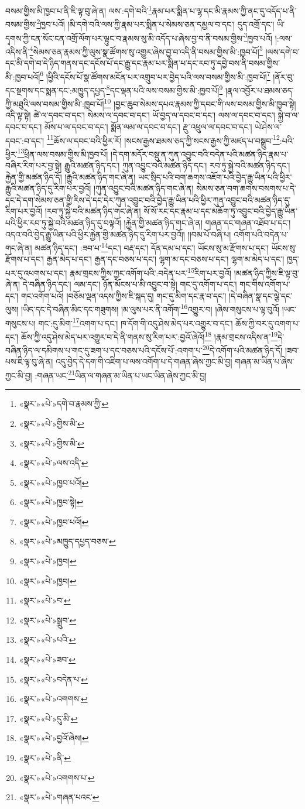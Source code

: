 བསམ་གྱིས་མི་ཁྱབ་པ་ནི་ཇི་ལྟ་བུ་ཞེ་ན། ལས་:དགེ་བའི་\footnote{«སྣར་»«པེ་»དགེ་བ་རྣམས་ཀྱི་}རྣམ་པར་སྨིན་པ་ལྷ་དང་མི་རྣམས་ཀྱི་ནང་དུ་འདོད་པ་ནི་བསམ་གྱིས་\footnote{«སྣར་»«པེ་»གྱིས་མི་}ཁྱབ་པའོ། །མི་དགེ་བའི་ལས་ཀྱི་རྣམ་པར་སྨིན་པ་སེམས་ཅན་དམྱལ་བ་དང་། དུད་འགྲོ་དང་། ཡི་དྭགས་ཀྱི་ངན་སོང་ངན་འགྲོ་ལོག་པར་ལྟུང་བ་རྣམས་སུ་མི་འདོད་པ་ཞེས་བྱ་བ་ནི་བསམ་གྱིས་\footnote{«སྣར་»«པེ་»གྱིས་མི་}ཁྱབ་པའོ། །:ལས་འདིས་ནི་\footnote{«སྣར་»«པེ་»ལས་འདི་}སེམས་ཅན་རྣམས་ཀྱི་ལུས་སྣ་ཚོགས་སུ་འགྱུར་ཞེས་བྱ་བ་འདི་ནི་བསམ་གྱིས་མི་:ཁྱབ་པོ།\footnote{«སྣར་»«པེ་»ཁྱབ་པའོ།} །ལས་དགེ་བ་དང་མི་དགེ་བ་དེ་ཉིད་གནས་དང་དངོས་པོ་དང་རྒྱུ་དང་རྣམ་པར་སྨིན་པ་དང་རབ་ཏུ་དབྱེ་བས་ནི་བསམ་གྱིས་མི་:ཁྱབ་པའོ།\footnote{«སྣར་»«པེ་»ཁྱབ་སྟེ།} །ཕྱིའི་དངོས་པོ་སྣ་ཚོགས་མངོན་པར་འགྲུབ་པར་བྱེད་པའི་ལས་བསམ་གྱིས་མི་:ཁྱབ་པོ།\footnote{«སྣར་»«པེ་»ཁྱབ་པའོ།} །ནོར་བུ་དང་སྔགས་དང་སྨན་དང་:མཁྱུད་དཔྱད་\footnote{«སྣར་»«པེ་»མཁྱུད་དཔྱད་བཅས་}དང་ལྡན་པའི་ལས་བསམ་གྱིས་མི་:ཁྱབ་པོ།\footnote{«སྣར་»«པེ་»ཁྱབ།} །རྣལ་འབྱོར་པ་ཐམས་ཅད་ཀྱི་མཐུའི་ལས་བསམ་གྱིས་མི་:ཁྱབ་པོ།\footnote{«སྣར་»«པེ་»ཁྱབ།} །བྱང་ཆུབ་སེམས་དཔའ་རྣམས་ཀྱི་དབང་གི་ལས་བསམ་གྱིས་མི་ཁྱབ་སྟེ། འདི་ལྟ་སྟེ། ཚེ་ལ་དབང་བ་དང་། སེམས་ལ་དབང་བ་དང་། ཡོ་བྱད་ལ་དབང་བ་དང་། ལས་ལ་དབང་བ་དང་། སྐྱེ་བ་ལ་དབང་བ་དང་། མོས་པ་ལ་དབང་བ་དང་། སྨོན་ལམ་ལ་དབང་བ་དང་། རྫུ་འཕྲུལ་ལ་དབང་བ་དང་། ཡེ་ཤེས་ལ་དབང་:བ་དང་། \footnote{«སྣར་»«པེ་»བ་}ཆོས་ལ་དབང་བའི་ཕྱིར་རོ། །སངས་རྒྱས་ཐམས་ཅད་ཀྱི་སངས་རྒྱས་ཀྱི་མཛད་པ་བསྒྲུབ་\footnote{«སྣར་»«པེ་»སྒྲུབ་}:པའི་ཕྱིར་\footnote{«སྣར་»«པེ་»པའི་}ཕྲིན་ལས་བསམ་གྱིས་མི་ཁྱབ་པོ། །དེ་དག་མདོར་བསྡུ་ན་ཀུན་འབྱུང་བའི་བདེན་པའི་མཚན་ཉིད་རྣམ་པ་བཞིར་རིག་པར་བྱ་སྟེ། རྒྱུའི་མཚན་ཉིད་དང་། ཀུན་འབྱུང་བའི་མཚན་ཉིད་དང་། རབ་ཏུ་སྐྱེ་བའི་མཚན་ཉིད་དང་། རྐྱེན་གྱི་མཚན་ཉིད་དོ། །རྒྱུའི་མཚན་ཉིད་གང་ཞེ་ན། ཡང་སྲིད་པའི་བག་ཆགས་འཇོག་པའི་བྱེད་རྒྱུ་ཡིན་པའི་ཕྱིར་རྒྱུའི་མཚན་ཉིད་དུ་རིག་པར་བྱའོ། །ཀུན་འབྱུང་བའི་མཚན་ཉིད་གང་ཞེ་ན། སེམས་ཅན་བག་ཆགས་བསགས་པ་དེ་དང་དེ་དག་སེམས་ཅན་གྱི་རིས་དེ་དང་དེར་ཀུན་འབྱུང་བའི་བྱེད་རྒྱུ་ཡིན་པའི་ཕྱིར་ཀུན་འབྱུང་བའི་མཚན་ཉིད་དུ་རིག་པར་བྱའོ། །རབ་ཏུ་སྐྱེ་བའི་མཚན་ཉིད་གང་ཞེ་ན། སོ་སོ་རང་དང་རྣམ་པ་དང་མཆོག་ཏུ་འབྱུང་བའི་བྱེད་རྒྱུ་ཡིན་པའི་ཕྱིར་རབ་ཏུ་སྐྱེ་བའི་མཚན་ཉིད་དུ་བལྟའོ། །རྐྱེན་གྱི་མཚན་ཉིད་གང་ཞེ་ན། གཞན་དང་གཞན་འཐོབ་པ་དང་། འདའ་བའི་བྱེད་རྒྱུ་ཡིན་པའི་ཕྱིར་རྐྱེན་གྱི་མཚན་ཉིད་དུ་རིག་པར་བྱའོ།། །།བམ་པོ་བཞི་པ། འགོག་པའི་བདེན་པ་གང་ཞེ་ན། མཚན་ཉིད་དང་། :ཟབ་པ་\footnote{«སྣར་»«པེ་»ཟབ་}དང་། བརྡ་དང་། དོན་དམ་པ་དང་། ཡོངས་སུ་མ་རྫོགས་པ་དང་། ཡོངས་སུ་རྫོགས་པ་དང་། རྒྱན་མེད་པ་དང་། རྒྱན་དང་བཅས་པ་དང་། ལྷག་མ་དང་བཅས་པ་དང་། ལྷག་མ་མེད་པ་དང་། ཁྱད་པར་དུ་འཕགས་པ་དང་། རྣམ་གྲངས་ཀྱིས་ཀྱང་འགོག་པའི་:བདེན་པར་\footnote{«སྣར་»«པེ་»བདེན་པ་}རིག་པར་བྱའོ། །མཚན་ཉིད་ཀྱིས་ཇི་ལྟ་བུ་ཞེ་ན། དེ་བཞིན་ཉིད་དང་། ལམ་དང་། ཉོན་མོངས་པ་མི་འབྱུང་བ་སྟེ། གང་དུ་འགོག་པ་དང་། གང་གིས་འགོག་པ་དང་། གང་འགོག་པའོ། །བཅོམ་ལྡན་འདས་ཀྱིས་ཇི་སྐད་དུ། གང་དུ་མིག་དང་རྣ་བ་དང་། །དེ་བཞིན་སྣ་དང་ལྕེ་དང་ལུས། །ཡིད་དང་དེ་བཞིན་མིང་དང་གཟུགས། །མ་ལུས་པར་ནི་འགོག་\footnote{«སྣར་»«པེ་»འགགས་}འགྱུར་བ། །ཞེས་གསུངས་པ་ལྟ་བུའོ། །ཡང་གསུངས་པ། གང་:དུ་མིག་\footnote{«སྣར་»«པེ་»དུ་མི་}འགག་པ་དང་། ཁ་དོག་གི་འདུ་ཤེས་མེད་པར་འགྱུར་བ་དང་། ཆོས་ཀྱི་བར་དུ་འགག་པ་དང་། ཆོས་ཀྱི་འདུ་ཤེས་མེད་པར་འགྱུར་བ་དེ་ནི་གནས་སུ་རིག་པར་:བྱའོ་ཞེའོ།\footnote{«སྣར་»«པེ་»བྱའོ་ཞེས།} །རྣམ་གྲངས་འདིས་ན་\footnote{«སྣར་»«པེ་»ནི་}དེ་བཞིན་ཉིད་ལ་དམིགས་པ་གང་དུ་ཟག་པ་དང་བཅས་པའི་དངོས་པོ་:འགག་པ་\footnote{«སྣར་»«པེ་»འགགས་པ་}དེ་འགོག་པའི་མཚན་ཉིད་དོ། །ཟབ་པས་ཇི་ལྟ་བུ་ཞེ་ན། འདུ་བྱེད་དེ་དག་གི་འཇིག་པ་ལས་འགོག་པ་དེ་གཞན་ཞེས་ཀྱང་མི་བྱ། གཞན་མ་ཡིན་པ་ཞེས་ཀྱང་མི་བྱ། :གཞན་ཡང་\footnote{«སྣར་»«པེ་»གཞན་པའང་}ཡིན་ལ་གཞན་མ་ཡིན་པ་ཡང་ཡིན་ཞེས་ཀྱང་མི་བྱ། 